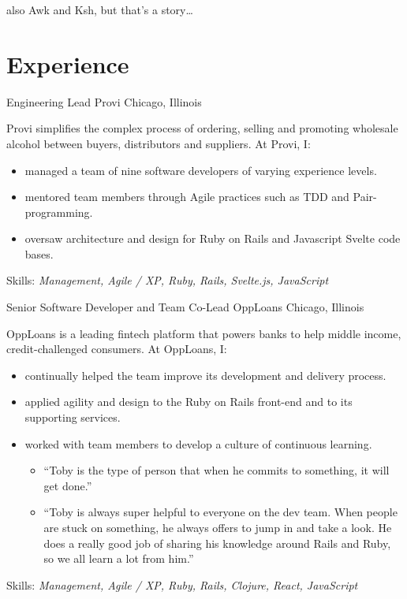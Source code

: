 \documentclass[11pt,letterpaper]{moderncv}
\begin{document}
 {\tiny also Awk and Ksh, but that's a story\ldots}

\section{Experience}

 {Engineering Lead} {Provi} {Chicago,
  Illinois} {} { %
  Provi simplifies the complex process of ordering, selling and promoting
  wholesale alcohol between buyers, distributors and suppliers.  At Provi, I:
  \begin{itemize}
  \item managed a team of nine software developers of varying experience
    levels.
  \item mentored team members through Agile practices such as TDD and
    Pair-programming.
  \item oversaw architecture and design for Ruby on Rails and Javascript
    Svelte code bases.
  \end{itemize}
  Skills: \emph{Management, Agile / XP, Ruby, Rails, Svelte.js, JavaScript}
}

 {Senior Software Developer and Team Co-Lead}
  {OppLoans} {Chicago, Illinois} {} { %
  OppLoans is a leading fintech platform that powers banks to help middle
  income, credit-challenged consumers.  At OppLoans, I:
  \begin{itemize}
  \item continually helped the team improve its development and delivery
    process.
  \item applied agility and design to the Ruby on Rails front-end and to its
    supporting services.
  \item worked with team members to develop a culture of continuous learning.
    \begin{itemize}
    \item ``Toby is the type of person that when he commits to something, it
      will get done.''
    \item ``Toby is always super helpful to everyone on the dev team.  When
      people are stuck on something, he always offers to jump in and take a
      look.  He does a really good job of sharing his knowledge around Rails
      and Ruby, so we all learn a lot from him.''
    \end{itemize}
  \end{itemize}
  Skills: \emph{Management, Agile / XP, Ruby, Rails, Clojure, React, JavaScript}
}
\end{document}
